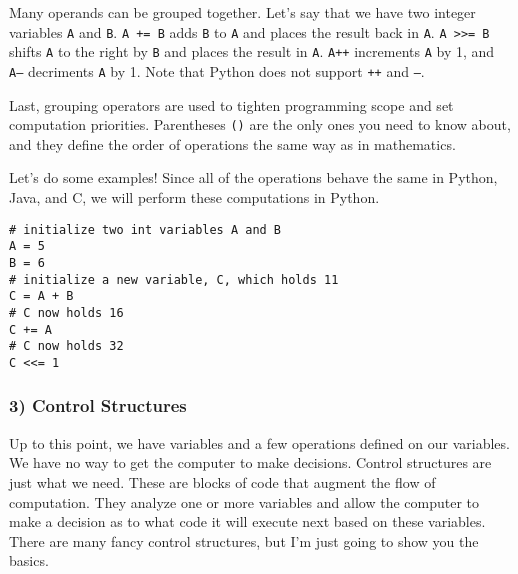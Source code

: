 \documentclass[a4paper]{article}
\begin{document}
Many operands can be grouped together. Let's say that we have two integer variables \texttt{A} and \texttt{B}. \texttt{A += B} adds \texttt{B} to \texttt{A} and places the result back in \texttt{A}. \texttt{A >>= B} shifts \texttt{A} to the right by \texttt{B} and places the result in \texttt{A}. \texttt{A++} increments \texttt{A} by 1, and \texttt{A--} decriments \texttt{A} by 1. Note that Python does not support \texttt{++} and \texttt{--}.

Last, grouping operators are used to tighten programming scope and set computation priorities. Parentheses \texttt{()} are the only ones you need to know about, and they define the order of operations the same way as in mathematics.

Let's \ex  do some examples! Since all of the operations behave the same in Python, Java, and C, we will perform these computations in Python.

\begin{verbatim}
# initialize two int variables A and B
A = 5
B = 6
# initialize a new variable, C, which holds 11
C = A + B
# C now holds 16
C += A
# C now holds 32
C <<= 1
\end{verbatim}

\subsubsection{3) Control Structures}

Up to this point, we have variables and a few operations defined on our variables. We have no way to get the computer to make decisions. Control structures are just what we need. These are blocks of code that augment the flow of computation. They analyze one or more variables and allow the computer to make a decision as to what code it will execute next based on these variables. There are many fancy control structures, but I'm just going to show you the basics.
\end{document}
